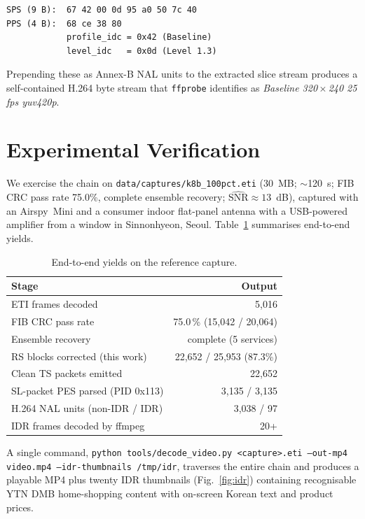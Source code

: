 \documentclass[conference,letterpaper,10pt]{IEEEtran}
\begin{document}
\begin{lstlisting}
SPS (9 B):  67 42 00 0d 95 a0 50 7c 40
PPS (4 B):  68 ce 38 80
            profile_idc = 0x42 (Baseline)
            level_idc   = 0x0d (Level 1.3)
\end{lstlisting}

Prepending these as Annex-B NAL units to the extracted slice
stream produces a self-contained H.264 byte stream that
\texttt{ffprobe} identifies as
\emph{Baseline 320\,$\times$\,240 25\,fps yuv420p}.

\section{Experimental Verification}

We exercise the chain on \texttt{data/captures/k8b\_100pct.eti}
(30~MB; $\sim$120~s; FIB CRC pass rate 75.0\%, complete ensemble
recovery; $\hat{\mathrm{SNR}}\approx 13$~dB), captured with an
Airspy~Mini and a consumer indoor flat-panel antenna with a
USB-powered amplifier from a window in Sinnonhyeon, Seoul.
Table~\ref{tab:results} summarises end-to-end yields.

\begin{table}[t]
\centering
\caption{End-to-end yields on the reference capture.}
\label{tab:results}
\begin{tabular}{lr}
\toprule
Stage & Output \\
\midrule
ETI frames decoded                       & 5{,}016 \\
FIB CRC pass rate                        & 75.0\,\% (15{,}042 / 20{,}064) \\
Ensemble recovery                        & complete (5 services) \\
RS blocks corrected (this work)          & 22{,}652 / 25{,}953 (87.3\%) \\
Clean TS packets emitted                 & 22{,}652 \\
SL-packet PES parsed (PID 0x113)         & 3{,}135 / 3{,}135 \\
H.264 NAL units (non-IDR / IDR)          & 3{,}038 / 97 \\
IDR frames decoded by ffmpeg             & 20+ \\
\bottomrule
\end{tabular}
\end{table}

A single command,
\texttt{python tools/decode\_video.py <capture>.eti
        --out-mp4 video.mp4 --idr-thumbnails /tmp/idr},
traverses the entire chain and produces a playable MP4 plus
twenty IDR thumbnails (Fig.~\ref{fig:idr}) containing
recognisable YTN DMB home-shopping content with on-screen
Korean text and product prices.
\end{document}
